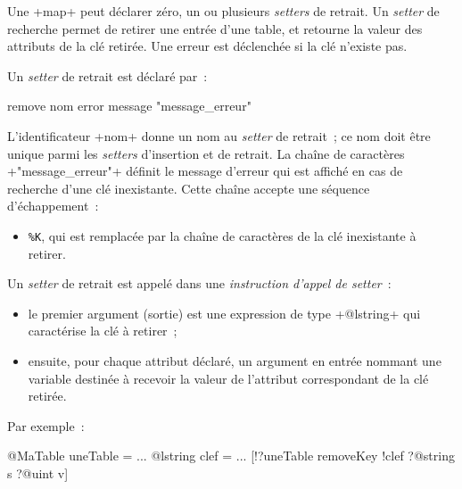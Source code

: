 
Une \ggs+map+ peut déclarer zéro, un ou plusieurs \emph{setters} de retrait. Un \emph{setter} de recherche permet de retirer une entrée d'une table, et retourne la valeur des attributs de la clé retirée. Une erreur est déclenchée si la clé n'existe pas.


Un \emph{setter} de retrait est déclaré par~:

\begin{galgas}
remove nom error message "message_erreur"
\end{galgas}

L'identificateur \ggs+nom+ donne un nom au \emph{setter} de retrait~; ce nom doit être unique parmi les \emph{setters} d'insertion et de retrait. La chaîne de caractères \ggs+"message_erreur"+ définit le message d'erreur qui est affiché en cas de recherche d'une clé inexistante. Cette chaîne accepte une séquence d'échappement~:
\begin{itemize}
  \item \texttt{\%K}, qui est remplacée par la chaîne de caractères de la clé inexistante à retirer.
\end{itemize}


Un \emph{setter} de retrait est appelé dans une \emph{instruction d'appel de setter}~:
\begin{itemize}
  \item le premier argument (sortie) est une expression de type \ggs+@lstring+ qui caractérise la clé à retirer~;
  \item ensuite, pour chaque attribut déclaré, un argument en entrée nommant une variable destinée à recevoir la valeur de l'attribut correspondant de la clé retirée.
\end{itemize}

Par exemple~:
\begin{galgas}
@MaTable uneTable = {}
...
@lstring clef = ...
[!?uneTable removeKey !clef ?@string s ?@uint v]
\end{galgas}


%
%

